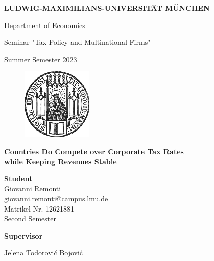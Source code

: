 \begin{titlepage}

\begin{center}
    {\large \uppercase{\textbf{Ludwig-Maximilians-Universität München}}}

    \vspace{0.5cm}
    
    {\Large Department of Economics}
    
    \vspace{0.5cm}

    {\Large Seminar "Tax Policy and Multinational Firms"}

    \vspace{0.5cm}

    {\Large Summer Semester 2023}
\end{center}

\vspace{0.5cm}

\begin{figure}[h]
    \centering
    \includegraphics[width=95pt]{img/lmu-logo.png}
\end{figure}

\begin{center}
    {\Large \textbf{Countries Do Compete over Corporate Tax Rates\\while Keeping Revenues Stable}\par}
\end{center}

\vfill

\begin{multicols}{2}
\noindent\large \textbf{Student}\\
\large Giovanni Remonti\\
\large giovanni.remonti@campus.lmu.de\\
\large Matrikel-Nr. 12621881\\
\large Second Semester

\columnbreak

\begin{flushright}
\large \textbf{Supervisor}\par
\large Jelena Todorović Bojović\par
\end{flushright}
\end{multicols}

\end{titlepage}